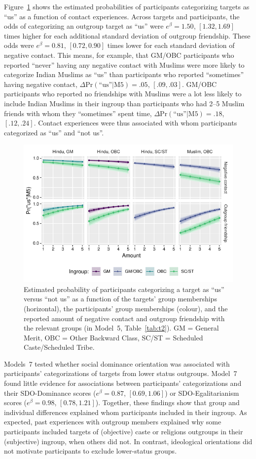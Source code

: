 \documentclass[12pt, a4paper]{article}
\newcommand{\pdif}[4]{$ \Delta\text{Pr} (\text{``us''} | \text{#1}) = #2$, $[#3, #4]$}
\begin{document}
Figure~\ref{fig:f4} shows the estimated probabilities of participants categorizing targets as ``us'' as a function of contact experiences. Across targets and participants, the odds of categorizing an outgroup target as ``us'' were $e^\beta = 1.50$, $[1.32, 1.69]$ times higher for each additional standard deviation of outgroup friendship. These odds were $e^\beta = 0.81$, $[0.72, 0.90]$ times lower for each standard deviation of negative contact. This means, for example, that GM/OBC participants who reported ``never'' having any negative contact with Muslims were more likely to categorize Indian Muslims as ``us'' than participants who reported ``sometimes'' having negative contact, \pdif{M5}{.05}{.09}{.03}. GM/OBC participants who reported no friendships with Muslims were a lot less likely to include Indian Muslims in their ingroup than participants who had 2--5 Muslim friends with whom they ``sometimes'' spent time, \pdif{M5}{.18}{.12}{.24}. Contact experiences were thus associated with whom participants categorized as ``us'' and ``not us''.

\begin{figure}
\centering
\includegraphics[scale=1]{../figures/figure-4}
\caption{Estimated probability of participants categorizing a target as ``us'' versus ``not us'' as a function of the targets' group memberships (horizontal), the participants' group memberships (colour), and the reported amount of negative contact and outgroup friendship with the relevant groups (in Model~5, Table~\ref{tab:t2}). GM = General Merit, OBC = Other Backward Class, SC/ST = Scheduled Caste/Scheduled Tribe.}
\label{fig:f4}
\end{figure}

Models~7 tested whether social dominance orientation was associated with participants' categorizations of targets from lower status outgroups. Model~7 found little evidence for associations between participants' categorizations and their SDO-Dominance scores ($e^\beta = 0.87$, $[0.69, 1.06]$) or SDO-Egalitarianism scores ($e^\beta = 0.98$, $[0.78, 1.21]$). Together, these findings show that group and individual differences explained whom participants included in their ingroup. As expected, past experiences with outgroup members explained why some participants included targets of (objective) caste or religions outgroups in their (subjective) ingroup, when others did not. In contrast, ideological orientations did not motivate participants to exclude lower-status groups.
\end{document}
